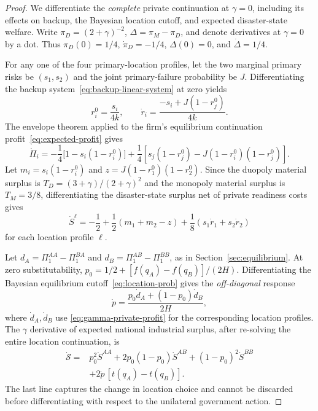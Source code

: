 \begin{proof}
We differentiate the \emph{complete} private continuation
at $\gamma=0$, including its effects on backup, the
Bayesian location cutoff, and expected disaster-state welfare.
Write $\pi_D=(2+\gamma)^{-2}$,
$\Delta=\pi_M-\pi_D$, and denote derivatives at
$\gamma=0$ by a dot. Thus
$\pi_D(0)=1/4$, $\dot\pi_D=-1/4$,
$\Delta(0)=0$, and $\dot\Delta=1/4$.

For any one of the four primary-location profiles, let the
two marginal primary risks be $(s_1,s_2)$ and the joint
primary-failure probability be $J$. Differentiating the
backup system~\eqref{eq:backup-linear-system} at zero yields
\begin{equation}
r_i^0=\frac{s_i}{4k},\qquad
\dot r_i=\frac{-s_i+J(1-r_j^0)}{4k}.
\label{eq:gamma-r-first-order}
\end{equation}
The envelope theorem applied to the firm's equilibrium
continuation profit~\eqref{eq:expected-profit} gives
\begin{equation}
\dot\Pi_i
=-\frac14\bigl[1-s_i(1-r_i^0)\bigr]
+\frac14\left[
s_j(1-r_j^0)-J(1-r_i^0)(1-r_j^0)
\right].
\label{eq:gamma-private-profit}
\end{equation}
Let $m_i=s_i(1-r_i^0)$ and
$z=J(1-r_1^0)(1-r_2^0)$.
Since the duopoly material surplus is
$T_D=(3+\gamma)/(2+\gamma)^2$ and the
monopoly material surplus is $T_M=3/8$,
differentiating the disaster-state surplus net of
private readiness costs gives
\begin{equation}
\dot S^\ell
=-\frac12+\frac12(m_1+m_2-z)
+\frac18(s_1\dot r_1+s_2\dot r_2)
\label{eq:gamma-state-surplus}
\end{equation}
for each location profile $\ell$.

Let $d_A=\Pi_1^{AA}-\Pi_1^{BA}$ and
$d_B=\Pi_1^{AB}-\Pi_1^{BB}$, as in
Section~\ref{sec:equilibrium}.
At zero substitutability,
$p_0=1/2+[f(q_A)-f(q_B)]/(2H)$.
Differentiating the Bayesian equilibrium cutoff~\eqref{eq:location-prob}
gives the \emph{off-diagonal} response
\begin{equation}
\dot p=\frac{p_0\dot d_A+(1-p_0)\dot d_B}{2H},
\label{eq:gamma-location-derivative}
\end{equation}
where $\dot d_A,\dot d_B$ use
\eqref{eq:gamma-private-profit} for the corresponding
location profiles. The $\gamma$ derivative of expected
national industrial surplus, after re-solving the entire
location continuation, is
\begin{align}
\dot{\mathcal S}
={}&p_0^2\dot S^{AA}
+2p_0(1-p_0)\dot S^{AB}
+(1-p_0)^2\dot S^{BB}
\nonumber\\
&+2\dot p\,[t(q_A)-t(q_B)].
\label{eq:gamma-national-surplus}
\end{align}
The last line captures the change in location choice and
cannot be discarded before differentiating with respect to
the unilateral government action.


\end{proof}
